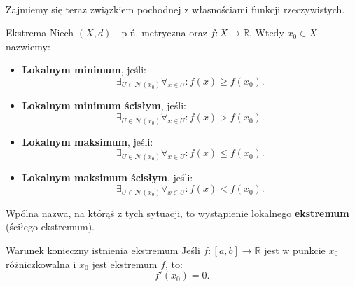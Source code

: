 \documentclass{article}
\numberwithin{defi}{section}
\numberwithin{defi}{section}
\newcommand{\R}{\mathbb{R}}
\newcommand{\Nau}{\mathcal{N}}
\renewcommand{\geq}{\geqslant}
\renewcommand{\leq}{\leqslant}
\begin{document}
    \paragraph{} Zajmiemy się teraz związkiem pochodnej z własnościami funkcji rzeczywistych.

    \begin{defr}{Ekstrema}
        Niech $(X, d)$ - p-ń. metryczna oraz $f: X \to \R$. Wtedy $x_0 \in X$ nazwiemy: \begin{itemize}
            \item \textbf{Lokalnym minimum}, jeśli: \begin{equation}
                \exists_{U \in \Nau(x_0)} \forall_{x \in U}: f(x) \geq f(x_0).
            \end{equation}

            \item \textbf{Lokalnym minimum ścisłym}, jeśli: \begin{equation}
                \exists_{U \in \Nau(x_0)} \forall_{x \in U}: f(x) > f(x_0).
            \end{equation}

            \item \textbf{Lokalnym maksimum}, jeśli: \begin{equation}
                \exists_{U \in \Nau(x_0)} \forall_{x \in U}: f(x) \leq f(x_0).
            \end{equation}

            \item \textbf{Lokalnym maksimum ścisłym}, jeśli: \begin{equation}
                \exists_{U \in \Nau(x_0)} \forall_{x \in U}: f(x) < f(x_0).
            \end{equation}

        \end{itemize} Wpólna nazwa, na którąś z tych sytuacji, to wystąpienie lokalnego \textbf{ekstremum} (ściłego ekstremum). 
    \end{defr}

    \begin{twier}{Warunek konieczny istnienia ekstremum}
        Jeśli $f: [a, b] \to \R$ jest w punkcie $x_0$ różniczkowalna i $x_0$ jest ekstremum $f$, to: \begin{equation}
            f'(x_0) = 0.
        \end{equation}
    \end{twier}
\end{document}
